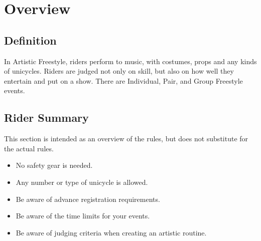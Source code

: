 \chapter{Overview}

\section{Definition}

In Artistic Freestyle, riders perform to music, with costumes, props and any kinds of unicycles.
Riders are judged not only on skill, but also on how well they entertain and put on a show.
There are Individual, Pair, and Group Freestyle events.

\section{Rider Summary}

This section is intended as an overview of the rules, but does not
substitute for the actual rules.
\begin{itemize}
\item No safety gear is needed.
\item Any number or type of unicycle is allowed.
\item Be aware of advance registration requirements.
\item Be aware of the time limits for your events.
\item Be aware of judging criteria when creating an artistic routine.
\end{itemize}
